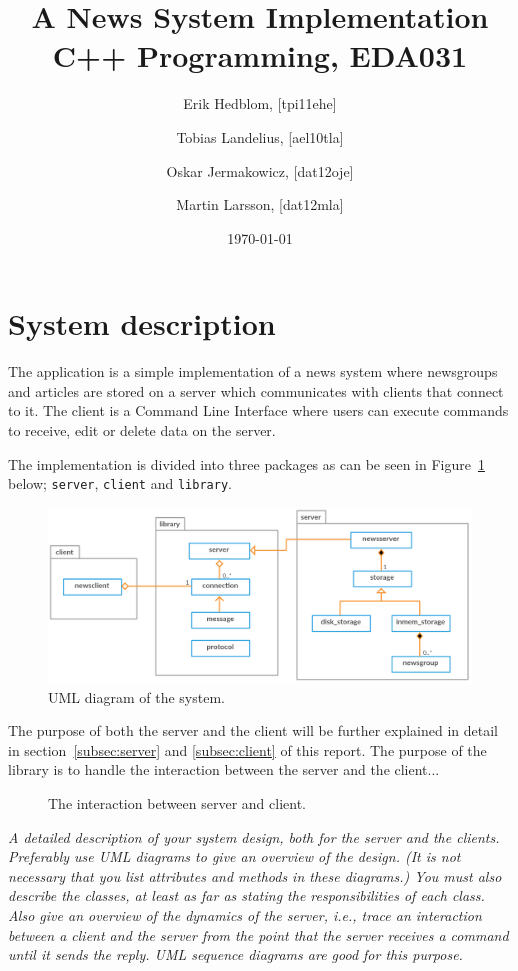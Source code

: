 \documentclass[a4paper]{article}
\title{A News System Implementation \\ C++ Programming, EDA031}
\author{Erik Hedblom, [tpi11ehe]
\and Tobias Landelius, [ael10tla]
\and Oskar Jermakowicz, [dat12oje]
\and Martin Larsson, [dat12mla]}
\date{\today}
\begin{document}
\maketitle

\newpage
\renewcommand{\contentsname}{Table of contents}
\tableofcontents
\newpage

\section{System description}
The application is a simple implementation of a news system where newsgroups and articles are stored on a server which communicates with clients that connect to it. The client is a Command Line Interface where users can execute commands to receive, edit or delete data on the server.

The implementation is divided into three packages as can be seen in Figure~\ref{fig:uml} below; \texttt{server}, \texttt{client} and \texttt{library}.

\begin{figure}[h]
    \centering
    \includegraphics[width=1.0\textwidth]{uml_diagram.png}
    \caption{UML diagram of the system.}
    \label{fig:uml}
\end{figure}

The purpose of both the server and the client will be further explained in detail in section~\ref{subsec:server} and \ref{subsec:client} of this report. The purpose of the library is to handle the interaction between the server and the client...

\begin{figure}[h]
    \centering
    \caption{The interaction between server and client.}
    \label{fig:sequence}
\end{figure}

\emph{A detailed description of your system design, both for the server and the clients. Preferably
use UML diagrams to give an overview of the design. (It is not necessary that you list
attributes and methods in these diagrams.) You must also describe the classes, at least as
far as stating the responsibilities of each class.
Also give an overview of the dynamics of the server, i.e., trace an interaction between a
client and the server from the point that the server receives a command until it sends the
reply. UML sequence diagrams are good for this purpose.}
\end{document}
